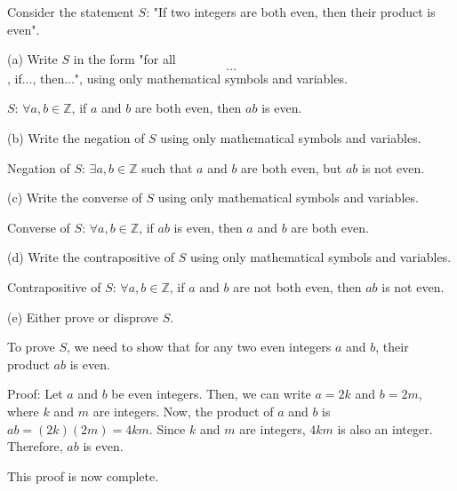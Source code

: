 \documentclass{article}
\begin{document}
Consider the statement $S$: "If two integers are both even, then their product is even".

(a) Write $S$ in the form "for all\[\ldots\], if..., then...", using only mathematical symbols and variables.

$S$: $\forall a, b \in \mathbb{Z}$, if $a$ and $b$ are both even, then $ab$ is even.

(b) Write the negation of $S$ using only mathematical symbols and variables.

Negation of $S$: $\exists a, b \in \mathbb{Z}$ such that $a$ and $b$ are both even, but $ab$ is not even.

(c) Write the converse of $S$ using only mathematical symbols and variables.

Converse of $S$: $\forall a, b \in \mathbb{Z}$, if $ab$ is even, then $a$ and $b$ are both even.

(d) Write the contrapositive of $S$ using only mathematical symbols and variables.

Contrapositive of $S$: $\forall a, b \in \mathbb{Z}$, if $a$ and $b$ are not both even, then $ab$ is not even.

(e) Either prove or disprove $S$.

To prove $S$, we need to show that for any two even integers $a$ and $b$, their product $ab$ is even.

Proof: Let $a$ and $b$ be even integers. Then, we can write $a = 2k$ and $b = 2m$, where $k$ and $m$ are integers. Now, the product of $a$ and $b$ is $ab = (2k)(2m) = 4km$. Since $k$ and $m$ are integers, $4km$ is also an integer. Therefore, $ab$ is even.

This proof is now complete.
\end{document}
